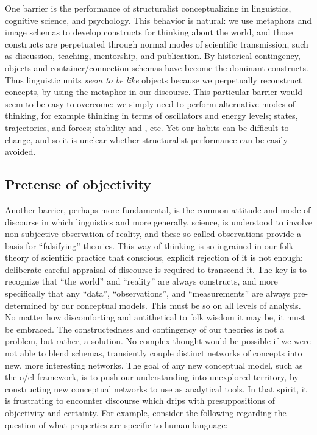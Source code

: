 One barrier is the performance of structuralist conceptualizing in linguistics, cognitive science, and psychology. This behavior is natural: we use metaphors and image schemas to develop constructs for thinking about the world, and those constructs are perpetuated through normal modes of scientific transmission, such as discussion, teaching, mentorship, and publication. By historical contingency, objects and container/connection schemas have become the dominant constructs. Thus linguistic units \textit{seem to be like} objects because we perpetually reconstruct  concepts, by using the metaphor in our discourse. This particular barrier would seem to be easy to overcome: we simply need to perform alternative modes of thinking, for example thinking in terms of oscillators and energy levels; states, trajectories, and forces; stability and , etc. Yet our habits can be difficult to change, and so it is unclear whether structuralist performance can be easily avoided. 

\subsection{Pretense of objectivity}

Another barrier, perhaps more fundamental, is the common attitude and mode of discourse in which linguistics and more generally, science, is understood to involve non-subjective observation of reality, and these so-called observations provide a basis for “falsifying” theories. This way of thinking is so ingrained in our folk theory of scientific practice that conscious, explicit rejection of it is not enough: deliberate careful appraisal of discourse is required to transcend it. The key is to recognize that “the world” and “reality” are always constructs, and more specifically that any “data”, “observations”, and “measurements” are always pre-determined by our conceptual models. This must be so on all levels of analysis. No matter how discomforting and antithetical to folk wisdom it may be, it must be embraced. The constructedness and contingency of our theories is not a problem, but rather, a solution. No complex thought would be possible if we were not able to blend schemas, transiently couple distinct networks of concepts into new, more interesting networks. The goal of any new conceptual model, such as the o/el framework, is to push our understanding into unexplored territory, by constructing new conceptual networks to use as analytical tools. In that spirit, it is frustrating to encounter discourse which drips with presuppositions of objectivity and certainty. For example, consider the following regarding the question of what properties are specific to human language:

